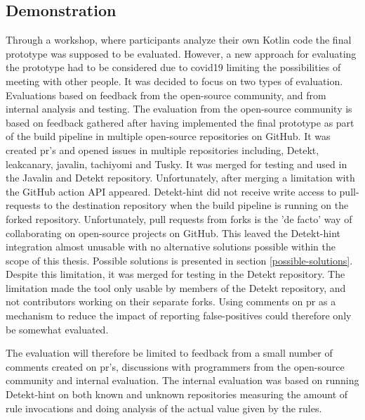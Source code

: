 \documentclass[pdftex,10pt,b5paper,twoside]{report}
\begin{document}
\subsection*{Demonstration}

Through a workshop, where participants analyze their own Kotlin code the final prototype was supposed to be evaluated. However, a new approach for evaluating the prototype had to be considered due to \gls{covid19} limiting the possibilities of meeting with other people. It was decided to focus on two types of evaluation. Evaluations based on feedback from the open-source community, and from internal analysis and testing. The evaluation from the open-source community is based on feedback gathered after having implemented the final prototype as part of the build pipeline in multiple open-source repositories on GitHub. It was created \gls{pr}'s and opened issues in multiple repositories including, Detekt\cite{detekt}, leakcanary\cite{leakcanary}, javalin\cite{javalin}, tachiyomi\cite{tachiyomi} and Tusky\cite{tusky}. It was merged for testing and used in the Javalin and Detekt repository. Unfortunately, after merging a limitation with the GitHub action API appeared. Detekt-hint did not receive write access to pull-requests to the destination repository when the build pipeline is running on the forked repository. Unfortunately, pull requests from forks is the 'de facto' way of collaborating on open-source projects on GitHub. This leaved the Detekt-hint integration almost unusable with no alternative solutions possible within the scope of this thesis. Possible solutions is presented in section \ref{possible-solutions}. Despite this limitation, it was merged for testing in the Detekt repository. The limitation made the tool only usable by members of the Detekt repository, and not contributors working on their separate forks. Using comments on \gls{pr} as a mechanism to reduce the impact of reporting false-positives could therefore only be somewhat evaluated.

The evaluation will therefore be limited to feedback from a small number of comments created on \gls{pr}'s, discussions with programmers from the open-source community and internal evaluation. The internal evaluation was based on running Detekt-hint on both known and unknown repositories measuring the amount of rule invocations and doing analysis of the actual value given by the rules. 
\end{document}
